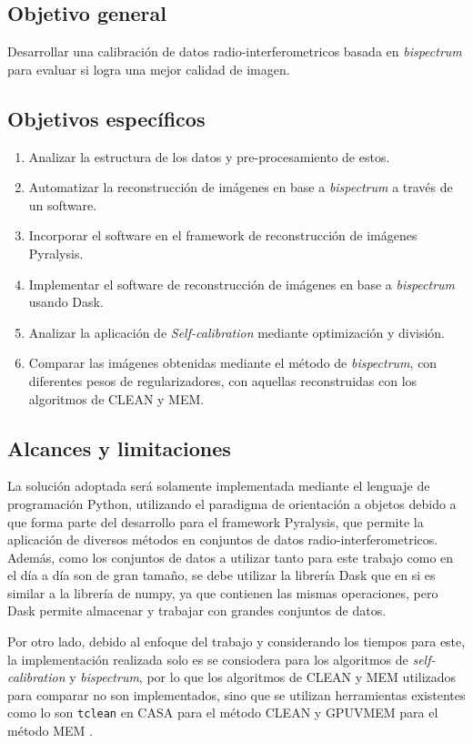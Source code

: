 \subsection{Objetivo general}
Desarrollar una calibración de datos radio-interferometricos basada en \textit{bispectrum} para evaluar si logra una mejor calidad de imagen.

\subsection{Objetivos espec\'ificos}
\begin{enumerate}
    \item Analizar la estructura de los datos y pre-procesamiento de estos. 
	\item Automatizar la reconstrucción de imágenes en base a \textit{bispectrum} a través de un software.
    \item Incorporar el software en el framework de reconstrucción de imágenes Pyralysis.
    \item Implementar el software de reconstrucción de imágenes en base a \textit{bispectrum} usando Dask.
    \item Analizar la aplicación de \textit{Self-calibration} mediante optimización y división. 
    \item Comparar las imágenes obtenidas mediante el método de \textit{bispectrum}, con diferentes pesos de regularizadores, con aquellas reconstruidas con los algoritmos de CLEAN y MEM.
\end{enumerate}

\subsection{Alcances y limitaciones}

La solución adoptada será solamente implementada mediante el lenguaje de programación Python, utilizando el paradigma de orientación a objetos debido a que forma parte del desarrollo para el framework Pyralysis, que permite la aplicación de diversos métodos en conjuntos de datos radio-interferometricos. Además, como los conjuntos de datos a utilizar tanto para este trabajo como en el día a día son de gran tamaño, se debe utilizar la librería Dask que en si es similar a la librería de numpy, ya que contienen las mismas operaciones, pero Dask permite almacenar y trabajar con grandes conjuntos de datos. 

Por otro lado, debido al enfoque del trabajo y considerando los tiempos para este, la implementación realizada solo es se consiodera para los algoritmos de \textit{self-calibration} y \textit{bispectrum}, por lo que los algoritmos de CLEAN y MEM utilizados para comparar no son implementados, sino que se utilizan herramientas existentes como lo son \texttt{tclean} en CASA para el método CLEAN \citep{CASA_clean} y GPUVMEM para el método MEM \citep{carcamo2018multi}. 

